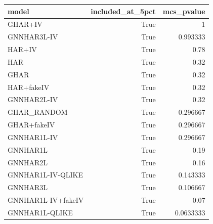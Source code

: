 \begin{tabular}{lrr}
\toprule
model & included_at_5pct & mcs_pvalue \\
\midrule
GHAR+IV & True & 1 \\
GNNHAR3L-IV & True & 0.993333 \\
HAR+IV & True & 0.78 \\
HAR & True & 0.32 \\
GHAR & True & 0.32 \\
HAR+fakeIV & True & 0.32 \\
GNNHAR2L-IV & True & 0.32 \\
GHAR_RANDOM & True & 0.296667 \\
GHAR+fakeIV & True & 0.296667 \\
GNNHAR1L-IV & True & 0.296667 \\
GNNHAR1L & True & 0.19 \\
GNNHAR2L & True & 0.16 \\
GNNHAR1L-IV-QLIKE & True & 0.143333 \\
GNNHAR3L & True & 0.106667 \\
GNNHAR1L-IV+fakeIV & True & 0.07 \\
GNNHAR1L-QLIKE & True & 0.0633333 \\
\bottomrule
\end{tabular}
